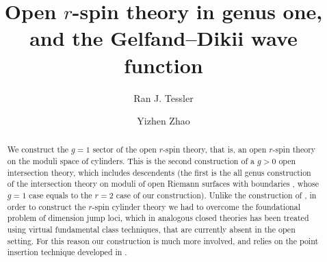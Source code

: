 \documentclass[11pt]{amsart}
\title{%
Open $r$-spin theory in genus one, and the Gelfand--Dikii wave function%
}
\date{}
\author{Ran J. Tessler \and Yizhen Zhao}
\theoremstyle{definition}
\theoremstyle{remark}
\newcommand{\<}{\left<}
\renewcommand{\>}{\right>}
\numberwithin{equation}{section}
\begin{document}
\maketitle
\begin{abstract}
We construct the $g=1$ sector of the open $r$-spin theory, that is, an open $r$-spin theory on the moduli space of cylinders. This is the second construction of a $g>0$ open intersection theory, which includes descendents (the first is %
the all genus construction %
of the intersection theory on moduli of open Riemann surfaces with %
boundaries \cite{PST14,Tes15}, whose %
$g=1$ case equals to the $r=2$ case of our construction). Unlike the construction %
of \cite{Tes15}, in %
order to construct the $r$-spin %
cylinder theory we %
had to overcome the foundational problem of dimension jump loci, which in analogous closed theories has been treated using virtual fundamental %
class techniques, that %
are currently absent in the open setting. For %
this reason our %
construction is much %
more involved, and %
relies on the point insertion technique %
developed in \cite{TZ1,TZ2}.



\end{abstract}
\end{document}
